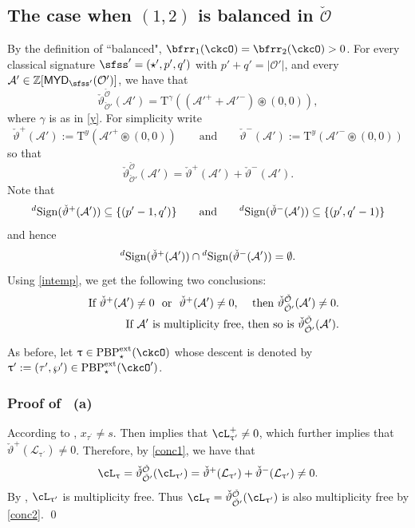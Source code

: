 \documentclass[11pt,a4paper]{amsart}
\def\MYD{{\mathsf{MYD}}}
\def\abs#1{\left|{#1}\right|}
\newcommand{\CA}{{\mathcal {A}}}
\newcommand{\CO}{{\mathcal {O}}}
\newcommand{\Z}{\mathbb{Z}}
\newcommand{\be}{\begin {equation}}
\newcommand{\ee}{\end {equation}}
\numberwithin{equation}{section}
\theoremstyle{remark}
\def\subset{\subseteq}
\def\PBPes{\mathrm{PBP}^{\mathrm{ext}}_{\star}}
\def\uptaup{\uptau^{\prime}}
\def\taup{\tau^{\prime}}
\def\maltese{\mathrm{T}}
\def\MYD{{\mathsf{MYD}}}
\def\pac#1{\ac_{#1}^+}
\def\ac{\cL}
\begin{document}
\subsection*{The case when $(1,2)$ is balanced in $\check \CO$} By the definition of ``balanced", $\bfrr_{1}(\ckcO)=\bfrr_{2}(\ckcO)>0$.
For every classical signature $\sfss'=(\star', p',q')$ with $p'+q'=\abs{\CO'}$, and every  $\CA'\in \Z[\MYD_{\sfss'}(\CO')]$, we have that 
 \be\label{tlcc1}
 \check{\vartheta}_{\check \CO'}^{\check \CO}(\CA')= \maltese^{\gamma} ((\CA'^+ + \CA'^-)\circledast (0,0)  ),
  \ee
where $\gamma$ is as in \eqref{y}. For simplicity write 
\[
\check \vartheta^+(\CA'):=\maltese^{y} (\CA'^+\circledast (0,0)  )\qquad\textrm{and}\qquad \check \vartheta^-(\CA'):=\maltese^{y} (\CA'^-\circledast (0,0)  )
\]
so that 
   \[
  \check{\vartheta}_{\check \CO'}^{\check \CO}(\CA')=\check \vartheta^+(\CA')+\check \vartheta^-(\CA').
    \]
Note that
\[
  \dsign(\check{\vartheta}^+(\CA'))\subset\{(p'-1,q')\}\qquad \textrm{and}\qquad
  \dsign(\check{\vartheta}^-(\CA'))\subset\{(p',q'-1)\}
\]
and hence 
\be\label{intemp}
\dsign(\check{\vartheta}^+(\CA'))\cap
  \dsign(\check{\vartheta}^-(\CA'))=\emptyset. 
\ee
Using \eqref{intemp}, we get the following two conclusions:
\begin{eqnarray}
\label{conc1}
  &&\textrm{If $\check{\vartheta}^+(\CA')\neq 0\ $ or  $\ \check{\vartheta}^+(\CA')\neq 0$, $\ \ $ then $\check{\vartheta}_{\check \CO'}^{\check \CO}(\CA')\neq 0$.}\smallskip \\
  \label{conc2}
  &&\textrm{If $\CA'$ is multiplicity free, then so is   $\check{\vartheta}_{\check \CO'}^{\check \CO}(\CA')$.}
\end{eqnarray}

As before, let $\uptau\in \PBPes(\ckcO)$ whose descent is denoted by $\uptau':=(\tau',\wp')\in \PBPes(\ckcO')$.
\subsubsection*{Proof of ~(a)}
According to ,  $x_{\taup}\neq s$.
Then   implies that  $\pac{\uptaup} \neq 0$, which further implies that $\check{\vartheta}^+ (\mathcal L_{\uptaup})\neq 0$. 
Therefore, by \eqref{conc1}, we have that 
\[
\ac_{\uptau}=\check{\vartheta}_{\check \CO'}^{\check \CO}(\ac_{\uptau'})=\check{\vartheta}^+ (\mathcal L_{\uptaup})+\check{\vartheta}^- (\mathcal L_{\uptaup})\neq 0.
\]By , $\ac_{\uptau'}$ is multiplicity free. Thus $\ac_{\uptau}=\check{\vartheta}_{\check \CO'}^{\check \CO}(\ac_{\uptau'})$ is also multiplicity free by \eqref{conc2}. \qed
\end{document}
